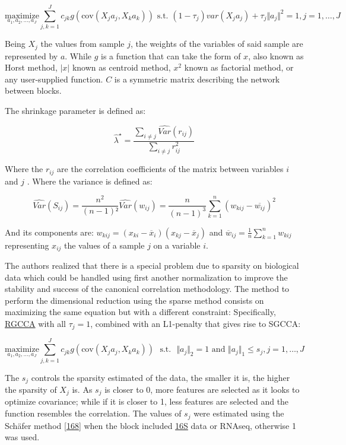 \documentclass[
  12pt,
  a4paper,
  twoside,
  openright]{book}
\begin{document}
\[
\underset{a_1,a_2, \dots,a_J}{\text{maximize}} \sum_{j, k = 1}^J c_{jk} g( \text{cov}(X_j a_j, X_k a_k)) \text{ s.t. } (1-\tau_j)var(X_j a_j)+\tau_j \Vert a_j \Vert^2 = 1, j=1, \ldots, J
\]

Being \(X_j\) the values from sample \(j\), the weights of the variables of said sample are represented by \(a\).
While \(g\) is a function that can take the form of \(x\), also known as Horst method, \(|x|\) known as centroid method, \(x^2\) known as factorial method, or any user-supplied function.
\(C\) is a symmetric matrix describing the network between blocks.

The shrinkage parameter is defined as:

\[
\widehat{\lambda}^{\star} = \dfrac{\sum_{i\neq j}\widehat{Var}(r_{ij})}{\sum_{i \neq j}r_{ij}^2}
\]

Where the \(r_{ij}\) are the correlation coefficients of the matrix between variables \(i\) and \(j\) .
Where the variance is defined as:

\[
\widehat{Var}(S_{ij}) = \dfrac{n^2}{{(n-1)}²} \widehat{Var}({w}_{ij}) = \dfrac{n}{{(n-1)}^3} \sum_{k=1}^n ( w_{kij} - \overline{w_{ij}})^2
\]

And its components are: \(w_{kij}=(x_{ki}-\overline{x}_i)(x_{kj}-\overline{x}_j)\) and \(\overline{w}_{ij}=\frac{1}{n}\sum_{k=1}^nw_{kij}\) representing \(x_{ij}\) the values of a sample \(j\) on a variable \(i\).

The authors realized that there is a special problem due to sparsity on biological data which could be handled using first another normalization to improve the stability and success of the canonical correlation methodology.
The method to perform the dimensional reduction using the sparse method consists on maximizing the same equation but with a different constraint: Specifically, \protect\hyperlink{acronyms_RGCCA}{RGCCA} with all \(\tau_j = 1\), combined with an L1-penalty that gives rise to SGCCA:

\[
\underset{a_1,a_2, \dots,a_J}{\text{maximize}} \sum_{j, k = 1}^J c_{jk}g( \text{cov}(X_j a_j, X_k a_k)) \text{~~s.t.~~} \Vert a_j \Vert_2 = 1 \text{ and } \Vert a_j \Vert_1 \le s_j, j=1,\ldots,J
\]

The \(s_j\) controls the sparsity estimated of the data, the smaller it is, the higher the sparsity of \(X_j\) is.
As \(s_j\) is closer to 0, more features are selected as it looks to optimize covariance; while if it is closer to 1, less features are selected and the function resembles the correlation.
The values of \(s_j\) were estimated using the Schäfer method {[}\protect\hyperlink{ref-schuxe4fer2005}{168}{]} when the block included \protect\hyperlink{acronyms_16S}{16S} data or RNAseq, otherwise 1 was used.
\end{document}
